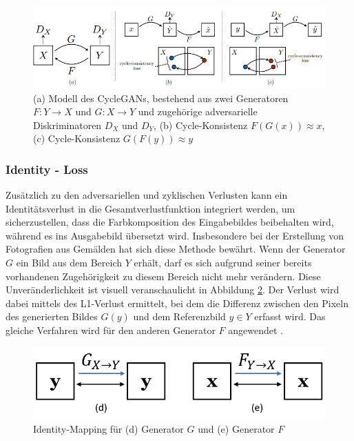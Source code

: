 \begin{figure}[ht]
	\centering
	\includegraphics[width=1\linewidth]{./images/cycle_consistency_loss.png}
	\caption{(a) Modell des CycleGANs, bestehend aus zwei Generatoren $F:Y\rightarrow X$ und $G:X \rightarrow Y$ und zugehörige adversarielle Diskriminatoren $D_X$ und $D_Y$,
     (b) Cycle-Konsistenz $F(G(x))\approx x$,
     (c) Cycle-Konsistenz $G(F(y))\approx y$\cite{Zhu.2017}}
	\label{fig:cycleConsistency}
\end{figure}

\subsubsection{Identity - Loss}
Zusätzlich zu den adversariellen und zyklischen Verlusten kann ein Identitätsverlust in die Gesamtverlustfunktion integriert werden, um sicherzustellen, dass die Farbkomposition des Eingabebildes beibehalten wird, während es ins Ausgabebild übersetzt wird. Insbesondere bei der Erstellung von Fotografien aus Gemälden hat sich diese Methode bewährt.  
Wenn der Generator $G$ ein Bild aus dem Bereich $Y$ erhält, darf es sich aufgrund seiner bereits vorhandenen Zugehörigkeit zu diesem Bereich nicht mehr verändern. Diese Unveränderlichkeit ist visuell veranschaulicht in Abbildung \ref{fig:IdentityMapping}.
Der Verlust wird dabei mittels des L1-Verlust ermittelt, bei dem die Differenz zwischen den Pixeln des generierten Bildes $G(y)$ und dem Referenzbild $y\in Y$ erfasst wird. Das gleiche Verfahren wird für den anderen Generator $F$ angewendet \cite{Zhu.2017}.

\begin{figure}[h]
	\centering
	\includegraphics[width=0.7\linewidth]{./images/identity_loss.png}
	\caption{Identity-Mapping für (d) Generator $G$ und (e) Generator $F$}
	\label{fig:IdentityMapping}
\end{figure}


